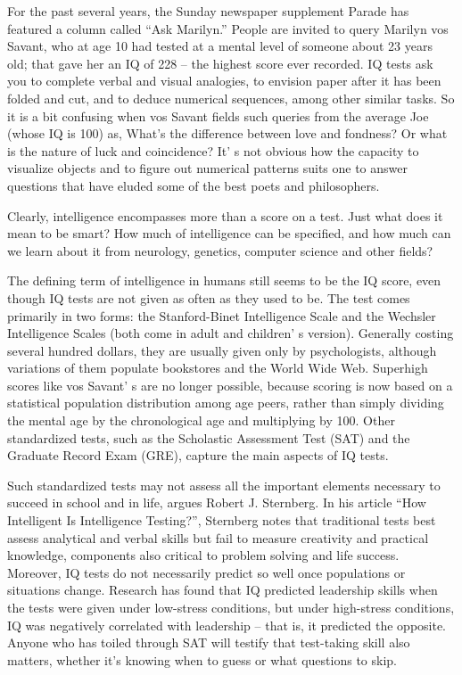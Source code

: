 For the past several years, the Sunday newspaper supplement Parade has featured a column called ``Ask Marilyn.'' People are invited to query Marilyn vos Savant, who at age 10 had tested at a mental level of someone about 23 years old; that gave her an IQ of 228 – the highest score ever recorded. IQ tests ask you to complete verbal and visual analogies, to envision paper after it has been folded and cut, and to deduce numerical sequences, among other similar tasks. So it is a bit confusing when vos Savant fields such queries from the average Joe (whose IQ is 100) as, What's the difference between love and fondness? Or what is the nature of luck and coincidence? It' s not obvious how the capacity to visualize objects and to figure out numerical patterns suits one to answer questions that have eluded some of the best poets and philosophers.


Clearly, intelligence encompasses more than a score on a test. Just what does it mean to be smart? How much of intelligence can be specified, and how much can we learn about it from neurology, genetics, computer science and other fields?


The defining term of intelligence in humans still seems to be the IQ score, even though IQ tests are not given as often as they used to be. The test comes primarily in two forms: the Stanford-Binet Intelligence Scale and the Wechsler Intelligence Scales (both come in adult and children' s version). Generally costing several hundred dollars, they are usually given only by psychologists, although variations of them populate bookstores and the World Wide Web. Superhigh scores like vos Savant' s are no longer possible, because scoring is now based on a statistical population distribution among age peers, rather than simply dividing the mental age by the chronological age and multiplying by 100. Other standardized tests, such as the Scholastic Assessment Test (SAT) and the Graduate Record Exam (GRE), capture the main aspects of IQ tests.


Such standardized tests may not assess all the important elements necessary to succeed in school and in life, argues Robert J. Sternberg. In his article ``How Intelligent Is Intelligence Testing?'', Sternberg notes that traditional tests best assess analytical and verbal skills but fail to measure creativity and practical knowledge, components also critical to problem solving and life success. Moreover, IQ tests do not necessarily predict so well once populations or situations change. Research has found that IQ predicted leadership skills when the tests were given under low-stress conditions, but under high-stress conditions, IQ was negatively correlated with leadership – that is, it predicted the opposite. Anyone who has toiled through SAT will testify that test-taking skill also matters, whether it's knowing when to guess or what questions to skip.